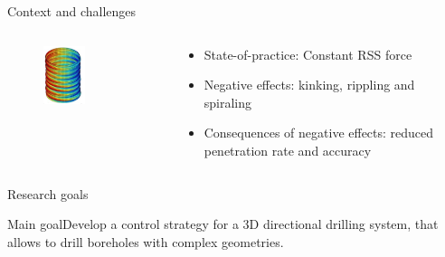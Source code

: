 \documentclass{beamer}
\begin{document}
\begin{frame}{Context and challenges}
		\begin{columns}[T]
		\hspace{1cm}	\begin{column}{0.5\textwidth}\setlength{\leftmargini}{0pt}
				\vspace{1cm}
				\begin{figure}[ht]\centering
					\includegraphics[width=0.5\textwidth]{images/Spiraling.png}
				\end{figure}
			\centering	[Sugiura 2009]
			\end{column}
			\begin{column}{0.6\textwidth}\setlength{\leftmargini}{0pt}
				\begin{itemize}
					\setlength\itemsep{3em}
					\item State-of-practice: Constant RSS force
					\item Negative effects: kinking, rippling and spiraling
					\item Consequences of negative effects: reduced penetration rate and accuracy
				\end{itemize}			
			\end{column}
		\end{columns}
\end{frame}

\begin{frame}{Research goals}
	\begin{block}{Main goal}\Large Develop a control strategy for a 3D directional drilling system, that allows to drill boreholes with complex geometries.
	\end{block}
\end{frame}
\end{document}

